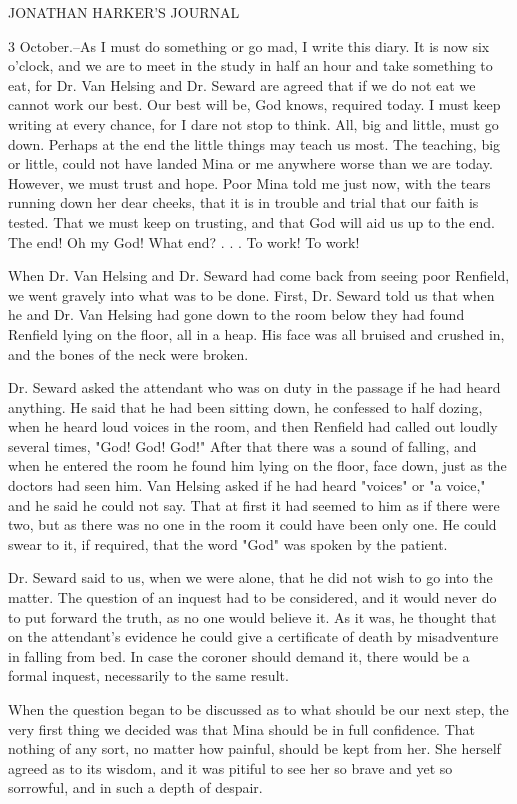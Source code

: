 JONATHAN HARKER'S JOURNAL 

3 October.--As I must do something or go mad, I write this diary. It is now six o'clock, and we are to meet in the study in half an hour and take something to eat, for Dr. Van Helsing and Dr. Seward are agreed that if we do not eat we cannot work our best. Our best will be, God knows, required today. I must keep writing at every chance, for I dare not stop to think. All, big and little, must go down. Perhaps at the end the little things may teach us most. The teaching, big or little, could not have landed Mina or me anywhere worse than we are today. However, we must trust and hope. Poor Mina told me just now, with the tears running down her dear cheeks, that it is in trouble and trial that our faith is tested. That we must keep on trusting, and that God will aid us up to the end. The end! Oh my God! What end? . . . To work! To work! 

When Dr. Van Helsing and Dr. Seward had come back from seeing poor Renfield, we went gravely into what was to be done. First, Dr. Seward told us that when he and Dr. Van Helsing had gone down to the room below they had found Renfield lying on the floor, all in a heap. His face was all bruised and crushed in, and the bones of the neck were broken. 

Dr. Seward asked the attendant who was on duty in the passage if he had heard anything. He said that he had been sitting down, he confessed to half dozing, when he heard loud voices in the room, and then Renfield had called out loudly several times, "God! God! God!" After that there was a sound of falling, and when he entered the room he found him lying on the floor, face down, just as the doctors had seen him. Van Helsing asked if he had heard "voices" or "a voice," and he said he could not say. That at first it had seemed to him as if there were two, but as there was no one in the room it could have been only one. He could swear to it, if required, that the word "God" was spoken by the patient. 

Dr. Seward said to us, when we were alone, that he did not wish to go into the matter. The question of an inquest had to be considered, and it would never do to put forward the truth, as no one would believe it. As it was, he thought that on the attendant's evidence he could give a certificate of death by misadventure in falling from bed. In case the coroner should demand it, there would be a formal inquest, necessarily to the same result. 

When the question began to be discussed as to what should be our next step, the very first thing we decided was that Mina should be in full confidence. That nothing of any sort, no matter how painful, should be kept from her. She herself agreed as to its wisdom, and it was pitiful to see her so brave and yet so sorrowful, and in such a depth of despair. 

